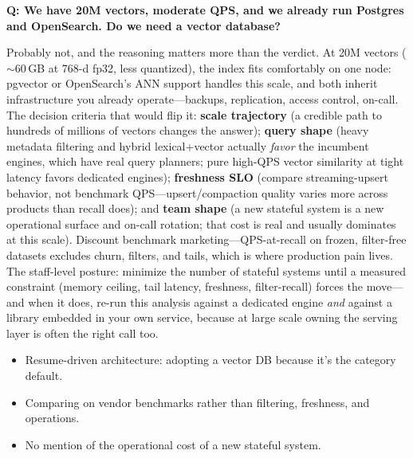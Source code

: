 \begin{interviewq}
\textbf{Q: We have 20M vectors, moderate QPS, and we already run Postgres and OpenSearch. Do we need a vector database?}

 \quad {} \quad \badgefreq{\freqmed}

\stronganswer

Probably not, and the reasoning matters more than the verdict. At 20M vectors ($\sim$60\,GB at 768-d fp32, less quantized), the index fits comfortably on one node: pgvector or OpenSearch's ANN support handles this scale, and both inherit infrastructure you already operate---backups, replication, access control, on-call. The decision criteria that would flip it: \textbf{scale trajectory} (a credible path to hundreds of millions of vectors changes the answer); \textbf{query shape} (heavy metadata filtering and hybrid lexical+vector actually \textit{favor} the incumbent engines, which have real query planners; pure high-QPS vector similarity at tight latency favors dedicated engines); \textbf{freshness SLO} (compare streaming-upsert behavior, not benchmark QPS---upsert/compaction quality varies more across products than recall does); and \textbf{team shape} (a new stateful system is a new operational surface and on-call rotation; that cost is real and usually dominates at this scale). Discount benchmark marketing---QPS-at-recall on frozen, filter-free datasets excludes churn, filters, and tails, which is where production pain lives. The staff-level posture: minimize the number of stateful systems until a measured constraint (memory ceiling, tail latency, freshness, filter-recall) forces the move---and when it does, re-run this analysis against a dedicated engine \textit{and} against a library embedded in your own service, because at large scale owning the serving layer is often the right call too.

\redflags
\begin{itemize}
    \item Resume-driven architecture: adopting a vector DB because it's the category default.
    \item Comparing on vendor benchmarks rather than filtering, freshness, and operations.
    \item No mention of the operational cost of a new stateful system.
\end{itemize}



\end{interviewq}
